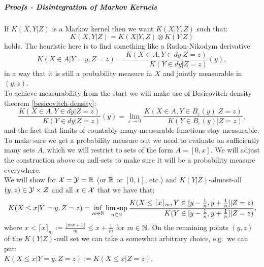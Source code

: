 \subparagraph{Proofs - Disintegration of Markov Kernels}

\begin{Rem}
    If $K(X,Y|Z)$ is a Markov kernel then we want $K(X|Y,Z)$ such that:
    \[K(X,Y|Z) = K(X|Y,Z) \otimes K(Y|Z)\]
    holds. The heuristic here is to find something like a Radon-Nikodym derivative:
    \[ K(X \in A|Y=y,Z=z) = \frac{K(X \in A,Y \in dy |Z=z)}{\phantom{X\in A,\,}K(Y \in dy|Z=z)}(y),  \]
    in a way that it is still a probability measure in $X$ and jointly measurable in $(y,z)$.\\
    To achieve measurability from the start we will  make use of Besicovitch density theorem \ref{besicovitch-density}:
    \[ \frac{K(X \in A,Y \in dy |Z=z)}{\phantom{X\in A,\,}K(Y \in dy|Z=z)}(y) = \lim_{\varepsilon \to 0} \frac{K(X \in A,Y \in B_{\varepsilon}(y) |Z=z)}{\phantom{X\in A,\,}K(Y \in B_{\varepsilon}(y) |Z=z)},   \]
    and the fact that limits of countably many measurable functions stay measurable. 
    To make sure we get a probability measure out we need to evaluate on sufficiently many sets $A$, which we will 
    restrict to sets of the form $A=[0,x]$.
    We will adjust the construction above on null-sets to make sure it will be a probability measure everywhere.\\
    We will show for $\mathcal{X}=\mathcal{Y}=\mathbb{R}$ (or $\bar {\mathbb{R}}$ or $[0,1]$, etc.) and $K(Y|Z)$-almost-all $(y,z) \in \mathcal{Y} \times \mathcal{Z}$ 
    and all $x\in \mathcal{X}$ that we have that:
    \[  K(X \le x|Y=y,Z=z) = \inf_{m \in \mathbb{N}} \limsup_{n \in \mathbb{N}} 
        \frac{K(X \le\lceil x\rceil_m,
    Y \in [y-\frac{1}{n},y+\frac{1}{n}] |Z=z)}{\phantom{X \le\lceil x\rceil_m,\,}K(Y \in [y-\frac{1}{n},y+\frac{1}{n}] |Z=z)},  \]
    where $x < \lceil x\rceil_m:=\frac{\lfloor mx+1\rfloor}{m} \le x + \frac{1}{m}$ for $m \in \mathbb{N}$.
    On the remaining points $(y,z)$ of the $K(Y|Z)$-null set we can take a somewhat arbitrary choice, e.g.\ we can put:\\
    $K(X \le x|Y=y,Z=z) := K(X\le x|Z=z)$.
\end{Rem}

